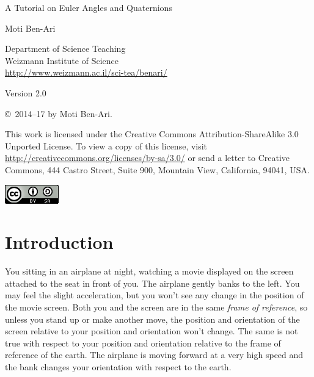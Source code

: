 \documentclass[11pt,a4paper]{report}
\begin{document}
\thispagestyle{empty}

\begin{center}
\begin{huge}
\begin{bfseries}
A Tutorial on Euler Angles and Quaternions
\end{bfseries}
\end{huge}

\bigskip
\bigskip
\bigskip

{\LARGE Moti Ben-Ari}

\bigskip

{\Large Department of Science Teaching\\
Weizmann Institute of Science\\
\bigskip
\url{http://www.weizmann.ac.il/sci-tea/benari/}
}

\bigskip
\bigskip


\begin{Large}
Version 2.0
\end{Large}
\end{center}

\vfill

\begin{center}
\copyright{}\  2014--17 by Moti Ben-Ari.
\end{center}

This work is licensed under the Creative Commons Attribution-ShareAlike 3.0 Unported License. To view a copy of this license, visit \url{http://creativecommons.org/licenses/by-sa/3.0/} or send a letter to Creative Commons, 444 Castro Street, Suite 900, Mountain View, California, 94041, USA.

\begin{center}
\includegraphics[width=.2\textwidth]{by-sa.png}
\end{center}

\clearpage
\setcounter{page}{1}

\chapter{Introduction}\label{s.intro}

You sitting in an airplane at night, watching a movie displayed on the screen attached to the seat in front of you. The airplane gently banks to the left. You may feel the slight acceleration, but you won't see any change in the position of the movie screen. Both you and the screen are in the same \emph{frame of reference}, so unless you stand up or make another move, the position and orientation of the screen relative to your position and orientation won't change. The same is not true with respect to your position and orientation relative to the frame of reference of the earth. The airplane is moving forward at a very high speed and the bank changes your orientation with respect to the earth.
\end{document}
